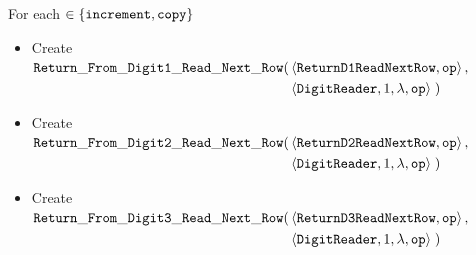 \noindent For each {\inc} $\in \{ {\tt increment, copy } \}$

\begin{itemize}
    \item Create
    $\begin{aligned}[t]
        {\tt Return\_From\_Digit1\_Read\_Next\_Row}(& \left \langle {\tt ReturnD1ReadNextRow},     {\tt op} \right\rangle, & \\
                                    & \left \langle {\tt DigitReader}, 1, \lambda, {\tt op} \right\rangle \;)
    \end{aligned}$

    \item Create
    $\begin{aligned}[t]
        {\tt Return\_From\_Digit2\_Read\_Next\_Row}(& \left \langle {\tt ReturnD2ReadNextRow},     {\tt op} \right\rangle, & \\
                                    & \left \langle {\tt DigitReader}, 1, \lambda, {\tt op} \right\rangle \;)
    \end{aligned}$

    \item Create
    $\begin{aligned}[t]
        {\tt Return\_From\_Digit3\_Read\_Next\_Row}(& \left \langle {\tt ReturnD3ReadNextRow},     {\tt op} \right\rangle, & \\
                                        & \left \langle {\tt DigitReader}, 1, \lambda, {\tt op} \right\rangle \;)
    \end{aligned}$
\end{itemize}
\vspace{1cm}